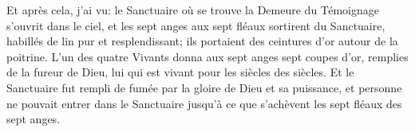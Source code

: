 Et après cela, j’ai vu:
	le Sanctuaire où se trouve la Demeure du Témoignage s’ouvrit dans le ciel,
	et les sept anges aux sept fléaux sortirent du Sanctuaire,
	habillés de lin pur et resplendissant;
	ils portaient des ceintures d’or autour de la poitrine.
L’un des quatre Vivants donna aux sept anges sept coupes d’or,
	remplies de la fureur de Dieu,
	lui qui est vivant pour les siècles des siècles.
Et le Sanctuaire fut rempli de fumée par la gloire de Dieu et sa puissance,
	et personne ne pouvait entrer dans le Sanctuaire
	jusqu’à ce que s’achèvent les sept fléaux des sept anges.
